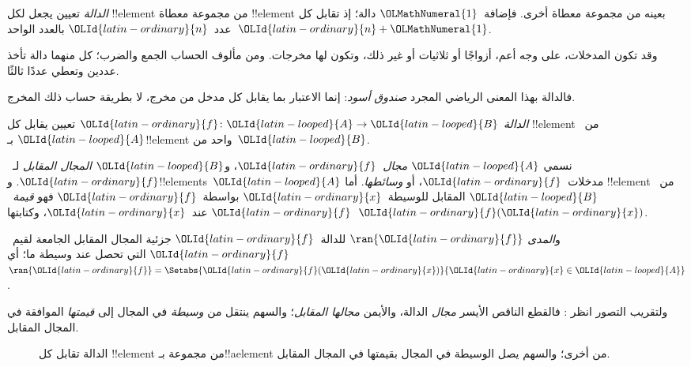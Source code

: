 \documentclass[../../../include/open-logic-section]{subfiles}
\begin{document}

\begin{explain}
\emph{الدالة} تعيين يجعل لكل !!{element} من مجموعة معطاة
!!{element} بعينه من مجموعة معطاة أخرى. فإضافة~${\OLMathNumeral{1}}$ دالة؛ إذ
تقابل كل عدد~${\OLId{latin-ordinary}{n}}$ بالعدد الواحد~${\OLId{latin-ordinary}{n}}+{\OLMathNumeral{1}}$.

وقد تكون المدخلات، على وجه أعم، أزواجًا أو ثلاثيات أو غير ذلك،
وتكون لها مخرجات. ومن مألوف الحساب الجمع والضرب؛ كل منهما دالة
تأخذ عددين وتعطي عددًا ثالثًا.

فالدالة بهذا المعنى الرياضي المجرد \emph{صندوق أسود}:
إنما الاعتبار بما يقابل كل مدخل من مخرج، لا بطريقة حساب ذلك المخرج.
\end{explain}

\begin{defn}[الدالة]
\emph{الدالة} ${\OLId{latin-ordinary}{f}} \colon {\OLId{latin-looped}{A}} \to {\OLId{latin-looped}{B}}$ تعيين يقابل كل !!{element}
من~${\OLId{latin-looped}{A}}$ بـ!!{element} واحد من~${\OLId{latin-looped}{B}}$.

نسمي ${\OLId{latin-looped}{A}}$ \emph{مجال}~${\OLId{latin-ordinary}{f}}$، و${\OLId{latin-looped}{B}}$ \emph{المجال المقابل} لـ~${\OLId{latin-ordinary}{f}}$.
و!!{element}s~${\OLId{latin-looped}{A}}$ مدخلات~${\OLId{latin-ordinary}{f}}$، أو \emph{وسائطها}. أما !!{element}
من~${\OLId{latin-looped}{B}}$ المقابل للوسيطة~${\OLId{latin-ordinary}{x}}$ بواسطة~${\OLId{latin-ordinary}{f}}$ فهو \emph{قيمة~${\OLId{latin-ordinary}{f}}$} عند~${\OLId{latin-ordinary}{x}}$،
وكتابتها~${\OLId{latin-ordinary}{f}}({\OLId{latin-ordinary}{x}})$.

و\emph{المدى} $\ran{{\OLId{latin-ordinary}{f}}}$ للدالة~${\OLId{latin-ordinary}{f}}$ جزئية المجال المقابل
الجامعة لقيم~${\OLId{latin-ordinary}{f}}$ التي تحصل عند وسيطة ما؛ أي $\ran{{\OLId{latin-ordinary}{f}}} =
\Setabs{{\OLId{latin-ordinary}{f}}({\OLId{latin-ordinary}{x}})}{{\OLId{latin-ordinary}{x}} \in {\OLId{latin-looped}{A}}}$.
\end{defn}

ولتقريب التصور انظر : فالقطع الناقص الأيسر
\emph{مجال} الدالة، والأيمن \emph{مجالها المقابل}؛ والسهم ينتقل من
\emph{وسيطة} في المجال إلى \emph{قيمتها} الموافقة في المجال المقابل.

\begin{figure}
  \caption{الدالة تقابل كل !!{element} من مجموعة بـ!!a{element} من أخرى؛
    والسهم يصل الوسيطة في المجال بقيمتها في المجال المقابل.}
\end{figure}
\end{document}
